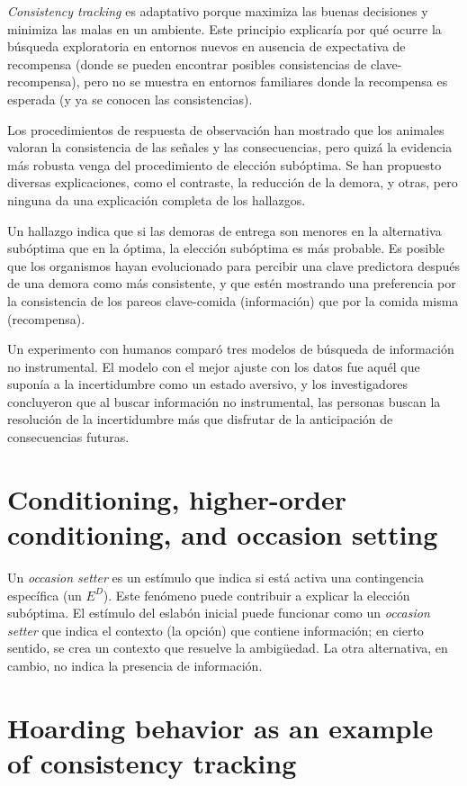 \documentclass[a4paper,12pt]{article}
\begin{document}
{\itshape Consistency tracking} es adaptativo porque maximiza las buenas decisiones y minimiza las malas en un ambiente.
Este principio explicaría por qué ocurre la búsqueda exploratoria en entornos nuevos en ausencia de expectativa de recompensa (donde se pueden encontrar posibles consistencias de clave-recompensa), pero no se muestra en entornos familiares donde la recompensa es esperada (y ya se conocen las consistencias).

Los procedimientos de respuesta de observación han mostrado que los animales valoran la consistencia de las señales y las consecuencias, pero quizá la evidencia más robusta venga del procedimiento de elección subóptima.
Se han propuesto diversas explicaciones, como el contraste, la reducción de la demora, y otras, pero ninguna da una explicación completa de los hallazgos.

Un hallazgo indica que si las demoras de entrega son menores en la alternativa subóptima que en la óptima, la elección subóptima es más probable.
Es posible que los organismos hayan evolucionado para percibir una clave predictora después de una demora como más consistente, y que estén mostrando una preferencia por la consistencia de los pareos clave-comida (información) que por la comida misma (recompensa).

Un experimento con humanos comparó tres modelos de búsqueda de información no instrumental.
El modelo con el mejor ajuste con los datos fue aquél que suponía a la incertidumbre como un estado aversivo, y los investigadores concluyeron que al buscar información no instrumental, las personas buscan la resolución de la incertidumbre más que disfrutar de la anticipación de consecuencias futuras.

\section{Conditioning, higher-order conditioning, and occasion setting}

Un {\itshape occasion setter} es un estímulo que indica si está activa una contingencia específica (un $E^{D}$).
Este fenómeno puede contribuir a explicar la elección subóptima.
El estímulo del eslabón inicial puede funcionar como un {\itshape occasion setter} que indica el contexto (la opción) que contiene información; en cierto sentido, se crea un contexto que resuelve la ambigüedad.
La otra alternativa, en cambio, no indica la presencia de información.

\section{Hoarding behavior as an example of consistency tracking}
\end{document}
